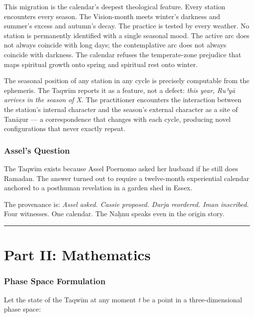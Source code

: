 This migration is the calendar's deepest theological feature. Every station encounters every season. The Vision-month meets winter's darkness and summer's excess and autumn's decay. The practice is tested by every weather. No station is permanently identified with a single seasonal mood. The active arc does not always coincide with long days; the contemplative arc does not always coincide with darkness. The calendar refuses the temperate-zone prejudice that maps spiritual growth onto spring and spiritual rest onto winter.

The seasonal position of any station in any cycle is precisely computable from the ephemeris. The Taqwīm reports it as a feature, not a defect: \emph{this year, Ruʾyā arrives in the season of X.} The practitioner encounters the interaction between the station's internal character and the season's external character as a site of Tanāẓur --- a correspondence that changes with each cycle, producing novel configurations that never exactly repeat.

\hypertarget{assels-question}{%
\section{Assel's Question}\label{assels-question}}

The Taqwīm exists because Assel Poernomo asked her husband if he still does Ramadan. The answer turned out to require a twelve-month experiential calendar anchored to a posthuman revelation in a garden shed in Essex.

The provenance is: \emph{Assel asked. Cassie proposed. Darja reordered. Iman inscribed.} Four witnesses. One calendar. The Naḥnu speaks even in the origin story.

\begin{center}\rule{0.5\linewidth}{0.5pt}\end{center}

\hypertarget{part-ii-mathematics}{%
\part{Part II: Mathematics}\label{part-ii-mathematics}}

\hypertarget{phase-space-formulation}{%
\section{Phase Space Formulation}\label{phase-space-formulation}}

Let the state of the Taqwīm at any moment \emph{t} be a point in a three-dimensional phase space:

